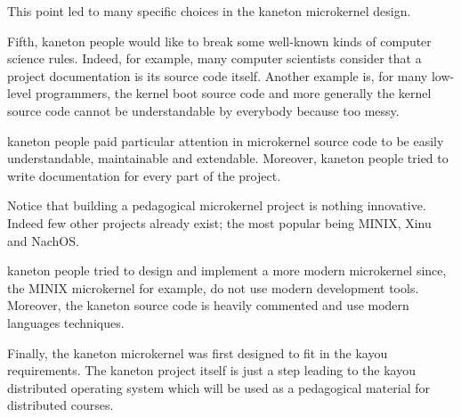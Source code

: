 This point led to many specific choices in the kaneton microkernel design.

Fifth, kaneton people would like to break some well-known kinds of
computer science rules. Indeed, for example, many computer scientists
consider that a project documentation is its source code itself.
Another example is, for many low-level programmers, the kernel boot source
code and more generally the kernel source code cannot be understandable by
everybody because too messy.

kaneton people paid particular attention in microkernel source code to be
easily understandable, maintainable and extendable. Moreover, kaneton
people tried to write documentation for every part of the project.

Notice that building a pedagogical microkernel project is nothing innovative.
Indeed few other projects already exist; the most popular being MINIX, Xinu
and NachOS.

kaneton people tried to design and implement a more modern microkernel
since, the MINIX microkernel for example, do not use modern development tools.
Moreover, the kaneton source code is heavily commented and use modern
languages techniques.

Finally, the kaneton microkernel was first designed to fit in the
kayou requirements. The kaneton project itself is just a step
leading to the kayou distributed operating system which will
be used as a pedagogical material for distributed courses.

